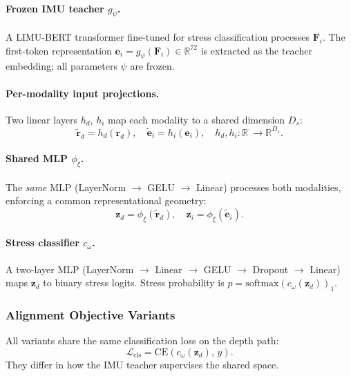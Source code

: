 \documentclass[sigconf,anonymous=false]{acmart}
\begin{document}
\paragraph{Frozen IMU teacher $g_\psi$.}
A LIMU-BERT transformer fine-tuned for stress classification processes
$\mathbf{F}_i$.  The first-token representation
$\mathbf{e}_i = g_\psi(\mathbf{F}_i) \in \mathbb{R}^{72}$
is extracted as the teacher embedding; all parameters $\psi$ are frozen.

\paragraph{Per-modality input projections.}
Two linear layers $h_d$, $h_i$ map each modality to a shared dimension $D_s$:
\begin{equation}
  \tilde{\mathbf{r}}_d = h_d(\mathbf{r}_d),\quad
  \tilde{\mathbf{e}}_i = h_i(\mathbf{e}_i),\quad
  h_d,h_i : \mathbb{R}^{\cdot}\to\mathbb{R}^{D_s}.
  \label{eq:proj}
\end{equation}

\paragraph{Shared MLP $\phi_\xi$.}
The \emph{same} MLP (LayerNorm $\to$ GELU $\to$ Linear) processes both
modalities, enforcing a common representational geometry:
\begin{equation}
  \mathbf{z}_d = \phi_\xi(\tilde{\mathbf{r}}_d),\quad
  \mathbf{z}_i = \phi_\xi(\tilde{\mathbf{e}}_i).
  \label{eq:shared}
\end{equation}

\paragraph{Stress classifier $c_\omega$.}
A two-layer MLP (LayerNorm $\to$ Linear $\to$ GELU $\to$ Dropout $\to$ Linear)
maps $\mathbf{z}_d$ to binary stress logits.
Stress probability is $p = \mathrm{softmax}(c_\omega(\mathbf{z}_d))_1$.

\subsubsection{Alignment Objective Variants}

All variants share the same classification loss on the depth path:
\begin{equation}
  \mathcal{L}_\text{cls} = \text{CE}(c_\omega(\mathbf{z}_d),\, y).
  \label{eq:cls}
\end{equation}
They differ in how the IMU teacher supervises the shared space.
\end{document}
